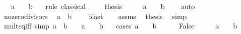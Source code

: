 \begin{isabellebody}
\ \ \ {\isachardoublequoteopen}a\ {\isacharequal}{\kern0pt}\ {}\ {\isasymor}\ b\ {\isacharequal}{\kern0pt}\ {}{\isachardoublequoteclose}\isanewline
%
\isadelimproof
%
\endisadelimproof
%
\isatagproof
{}\isamarkupfalse%
\ {\isacharparenleft}{\kern0pt}rule\ classical{\isacharparenright}{\kern0pt}\isanewline
\ \ \isamarkupfalse%
\ {\isachardoublequoteopen}{\isasymnot}\ {\isacharquery}{\kern0pt}thesis{\isachardoublequoteclose}\isanewline
\ \ \isamarkupfalse%
\ \isamarkupfalse%
\ {\isachardoublequoteopen}a\ {\isasymnoteq}\ {}{\isachardoublequoteclose}\ \ {\isachardoublequoteopen}b\ {\isasymnoteq}\ {}{\isachardoublequoteclose}\ \isamarkupfalse%
\ auto\isanewline
\ \ \isamarkupfalse%
\ no{\isacharunderscore}{\kern0pt}zero{\isacharunderscore}{\kern0pt}divisors\ \isamarkupfalse%
\ {\isachardoublequoteopen}a\ {\isacharasterisk}{\kern0pt}\ b\ {\isasymnoteq}\ {}{\isachardoublequoteclose}\ \isamarkupfalse%
\ blast\isanewline
\ \ \isamarkupfalse%
\ assms\ \isamarkupfalse%
\ {\isacharquery}{\kern0pt}thesis\ \isamarkupfalse%
\ simp\isanewline
{}\isamarkupfalse%
%
\endisatagproof
{\isafoldproof}%
%
\isadelimproof
\isanewline
%
\endisadelimproof
\isanewline
{}\isamarkupfalse%
\ mult{\isacharunderscore}{\kern0pt}eq{\isacharunderscore}{\kern0pt}{}{\isacharunderscore}{\kern0pt}iff\ {\isacharbrackleft}{\kern0pt}simp{\isacharbrackright}{\kern0pt}{\isacharcolon}{\kern0pt}\ {\isachardoublequoteopen}a\ {\isacharasterisk}{\kern0pt}\ b\ {\isacharequal}{\kern0pt}\ {}\ {\isasymlongleftrightarrow}\ a\ {\isacharequal}{\kern0pt}\ {}\ {\isasymor}\ b\ {\isacharequal}{\kern0pt}\ {}{\isachardoublequoteclose}\isanewline
%
\isadelimproof
%
\endisadelimproof
%
\isatagproof
{}\isamarkupfalse%
\ {\isacharparenleft}{\kern0pt}cases\ {\isachardoublequoteopen}a\ {\isacharequal}{\kern0pt}\ {}\ {\isasymor}\ b\ {\isacharequal}{\kern0pt}\ {}{\isachardoublequoteclose}{\isacharparenright}{\kern0pt}\isanewline
\ \ \isamarkupfalse%
\ False\isanewline
\ \ \isamarkupfalse%
\ \isamarkupfalse%
\ {\isachardoublequoteopen}a\ {\isasymnoteq}\ {}{\isachardoublequoteclose}\ \ {\isachardoublequoteopen}b\ {\isasymnoteq}\ {}{\isachardoublequoteclose}\ \isamarkupfalse%

\end{isabellebody}

